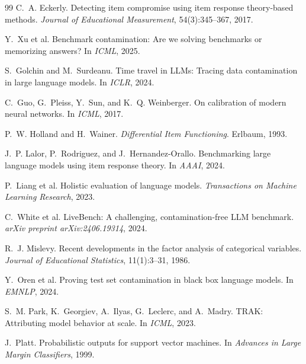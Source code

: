 \documentclass[11pt,a4paper]{article}
\begin{document}
\begin{thebibliography}{99}
C.~A. Eckerly.
\newblock Detecting item compromise using item response theory-based methods.
\newblock \emph{Journal of Educational Measurement}, 54(3):345--367, 2017.

Y.~Xu et al.
\newblock Benchmark contamination: Are we solving benchmarks or memorizing answers?
\newblock In \emph{ICML}, 2025.

S.~Golchin and M.~Surdeanu.
\newblock Time travel in LLMs: Tracing data contamination in large language models.
\newblock In \emph{ICLR}, 2024.

C.~Guo, G.~Pleiss, Y.~Sun, and K.~Q. Weinberger.
\newblock On calibration of modern neural networks.
\newblock In \emph{ICML}, 2017.

P.~W. Holland and H.~Wainer.
\newblock \emph{Differential Item Functioning}.
\newblock Erlbaum, 1993.

J.~P. Lalor, P.~Rodriguez, and J.~Hernandez-Orallo.
\newblock Benchmarking large language models using item response theory.
\newblock In \emph{AAAI}, 2024.

P.~Liang et al.
\newblock Holistic evaluation of language models.
\newblock \emph{Transactions on Machine Learning Research}, 2023.

C.~White et al.
\newblock LiveBench: A challenging, contamination-free LLM benchmark.
\newblock \emph{arXiv preprint arXiv:2406.19314}, 2024.

R.~J. Mislevy.
\newblock Recent developments in the factor analysis of categorical variables.
\newblock \emph{Journal of Educational Statistics}, 11(1):3--31, 1986.

Y.~Oren et al.
\newblock Proving test set contamination in black box language models.
\newblock In \emph{EMNLP}, 2024.

S.~M. Park, K.~Georgiev, A.~Ilyas, G.~Leclerc, and A.~Madry.
\newblock TRAK: Attributing model behavior at scale.
\newblock In \emph{ICML}, 2023.

J.~Platt.
\newblock Probabilistic outputs for support vector machines.
\newblock In \emph{Advances in Large Margin Classifiers}, 1999.


\end{thebibliography}
\end{document}
